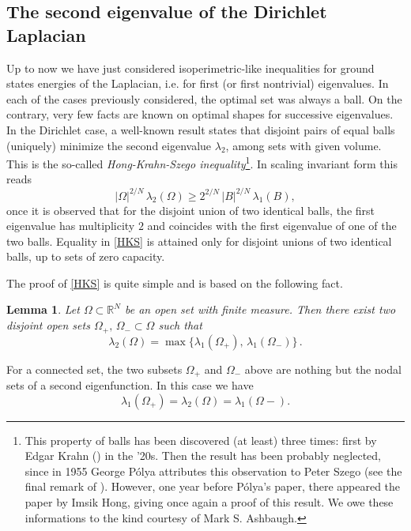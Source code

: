 \documentclass{amsart}
\newtheorem{lemma}{Lemma}[section]
\theoremstyle{definition}
\numberwithin{equation}{section}
\begin{document}
\subsection{The second eigenvalue of the Dirichlet Laplacian}

Up to now we have just considered isoperimetric-like inequalities for ground states energies of the Laplacian, i.e. for first (or first nontrivial) eigenvalues. In each of the cases previously considered, the optimal set was always a ball.
On the contrary, very few facts are known on optimal shapes for successive eigenvalues. In the Dirichlet case, a well-known result states that disjoint pairs of equal balls (uniquely) minimize the second eigenvalue $\lambda_2$, among sets with given volume. This is the so-called {\it Hong-Krahn-Szego inequality}\footnote{This property of balls has been discovered (at least) three times: first by Edgar Krahn (\cite{Kr}) in the '20s. Then the result has been probably neglected, since in 1955 George P\'olya attributes this observation to Peter Szego (see the final remark of \cite{MR0073047}). However, one year before P\'olya's paper, there appeared the paper \cite{MR0070015} by Imsik Hong, giving once again a proof of this result. We owe these informations to the kind courtesy of Mark S. Ashbaugh.}. In scaling invariant form this reads
\begin{equation}
\label{HKS}
|\Omega|^{2/N}\,\lambda_2(\Omega)\ge 2^{2/N}\,|B|^{2/N}\, \lambda_1(B),
\end{equation}
once it is observed that for the disjoint union of two identical balls, the first eigenvalue has multiplicity $2$ and coincides with the first eigenvalue of one of the two balls. Equality in \eqref{HKS} is attained only for disjoint unions of two identical balls, up to sets of zero capacity.
\par
The proof of \eqref{HKS} is quite simple and is based on the following fact.
\begin{lemma}
\label{lm:tecnico}
Let $\Omega\subset\mathbb{R}^N$ be an open set with finite measure. Then there exist two disjoint open sets $\Omega_+,\,\Omega_-\subset \Omega$ such that
\begin{equation}
\label{lemlam2}
\lambda_2(\Omega)=\max\Big\{\lambda_1(\Omega_+),\,\lambda_1(\Omega_-)\Big\}\,. 
\end{equation}
\end{lemma}
For a connected set, the two subsets $\Omega_+$ and $\Omega_-$ above are nothing but the nodal sets of a second eigenfunction. In this case we have
\[
\lambda_1(\Omega_+)=\lambda_2(\Omega)=\lambda_1(\Omega-).
\]
\end{document}
